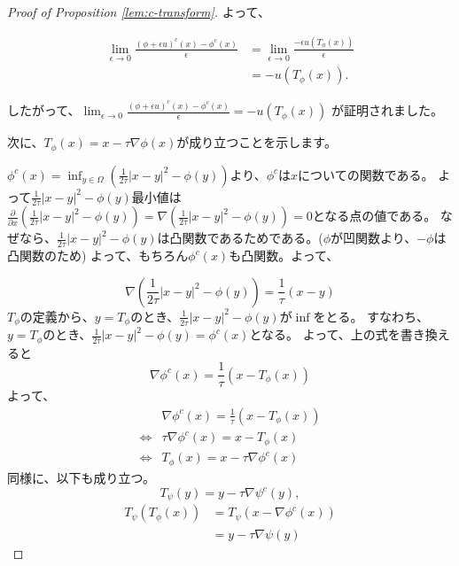 \documentclass{jsarticle}
\theoremstyle{definition}
\begin{document}
\begin{proof}[Proof of Proposition \ref{lem:c-transform}]
    よって、
    
    \begin{align*}
       \lim_{\epsilon \to 0}\frac{(\phi + \epsilon u)^c(x) - \phi^c(x)}{\epsilon} &=  \lim_{\epsilon \to 0} \frac{-\epsilon u \left(T_\phi(x)\right)}{\epsilon} \\
    &= -u (T_\phi(x)).
    \end{align*}
    
    したがって、$\lim_{\epsilon \to 0} \frac{(\phi + \epsilon u)^c(x) - \phi^c(x)}{\epsilon} = -u(T_\phi(x))$ が証明されました。
    
    次に、$T_\phi(x) = x - \tau \nabla \phi(x)$が成り立つことを示します。
    
    $\phi^c(x) = \inf_{y\in\Omega} \left(\frac{1}{2 \tau}|x - y|^2 - \phi(y)\right)$より、$\phi^c$は$x$についての関数である。
    よって$\frac{1}{2 \tau}|x - y|^2- \phi(y)$最小値は$\frac{\partial }{\partial x} (\frac{1}{2 \tau}|x - y|^2- \phi(y)) = \nabla (\frac{1}{2 \tau}|x - y|^2- \phi(y)) = 0$となる点の値である。
    なぜなら、$\frac{1}{2 \tau}|x - y|^2- \phi(y)$は凸関数であるためである。($\phi$が凹関数より、$- \phi$は凸関数のため)
    よって、もちろん$\phi^c(x)$も凸関数。よって、
    
    $$
      \nabla (\frac{1}{2 \tau}|x - y|^2- \phi(y)) = \frac{1}{\tau}(x - y)
    $$
    $T_\phi$の定義から、$y = T_\phi$のとき、$\frac{1}{2 \tau}|x - y|^2- \phi(y)$が$\inf$をとる。
    すなわち、$y = T_\phi$のとき、$\frac{1}{2 \tau}|x - y|^2- \phi(y) = \phi^c(x)$となる。
    よって、上の式を書き換えると
    $$
        \nabla \phi^c(x) = \frac{1}{\tau}(x - T_\phi(x))
    $$
    よって、
    \begin{eqnarray*}
        &\nabla \phi^c(x) = \frac{1}{\tau}(x - T_\phi(x)) \\
        \iff& \tau \nabla \phi^c(x) = x - T_\phi(x)\\
        \iff& T_\phi(x) = x - \tau \nabla \phi^c(x)
    \end{eqnarray*}
    同様に、以下も成り立つ。
    $$
            T_\psi(y) = y - \tau \nabla \psi^c(y),
    $$
    \begin{align*}
        T_\psi(T_\phi(x))   &= T_\psi(x - \nabla \phi^c(x))\\
                            &= y - \tau \nabla \psi(y)
    \end{align*}
    
\end{proof}
\end{document}
